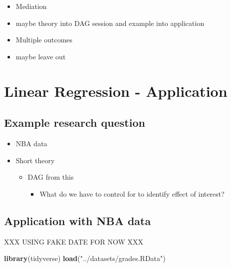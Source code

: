 \documentclass[
]{book}
\newenvironment{Shaded}{\begin{snugshade}}{\end{snugshade}}
\newcommand{\FunctionTok}[1]{\textcolor[rgb]{0.13,0.29,0.53}{\textbf{#1}}}
\newcommand{\NormalTok}[1]{#1}
\newcommand{\StringTok}[1]{\textcolor[rgb]{0.31,0.60,0.02}{#1}}
\providecommand{\tightlist}{%
  \setlength{\itemsep}{0pt}\setlength{\parskip}{0pt}}
\begin{document}
\begin{itemize}
\tightlist
\item
  Mediation
\item
  maybe theory into DAG session and example into application
\item
  Multiple outcomes
\item
  maybe leave out
\end{itemize}

\hypertarget{lin-a}{%
\chapter{Linear Regression - Application}\label{lin-a}}

\hypertarget{example-research-question}{%
\section{Example research question}\label{example-research-question}}

\begin{itemize}
\tightlist
\item
  NBA data
\item
  Short theory

  \begin{itemize}
  \tightlist
  \item
    DAG from this

    \begin{itemize}
    \tightlist
    \item
      What do we have to control for to identify effect of interest?
    \end{itemize}
  \end{itemize}
\end{itemize}

\hypertarget{application-with-nba-data}{%
\section{Application with NBA data}\label{application-with-nba-data}}

XXX USING FAKE DATE FOR NOW XXX

\begin{Shaded}
\begin{Highlighting}[]
\FunctionTok{library}\NormalTok{(tidyverse)}
\FunctionTok{load}\NormalTok{(}\StringTok{"../datasets/grades.RData"}\NormalTok{)}
\end{Highlighting}
\end{Shaded}
\end{document}

